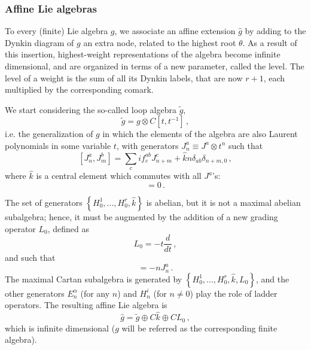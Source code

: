 \documentclass[a4paper,12pt]{report}
\begin{document}
\vspace{0.5cm}

\subsubsection{Affine Lie algebras}

To every (finite) Lie algebra $g$, we associate an affine extension $\hat{g}$ by adding to the Dynkin diagram of
$g$ an extra node, related to the highest root $\theta$. As a result of this insertion, highest-weight
representations of the algebra become infinite dimensional, and are organized in terms of a new parameter, called
the level. The level of a weight is the sum of all its Dynkin labels, that are now $r+1$, each multiplied by the
corresponding comark.

We start considering the so-called loop algebra $\tilde{g}$,
\begin{equation}
\tilde{g}=g\otimes C\left[t,t^{-1}\right]\,,
\end{equation}
i.e. the generalization of $g$ in which the elements of the algebra are also Laurent polynomials in some variable
$t$, with generators $J_{n}^{a}\equiv J^{a}\otimes t^{n}$ such that
\begin{equation}\label{currentalg}
[J_{n}^{a},J_{m}^{b}]=\sum_{c}if^{ab}_{c}J_{n+m}^{c}+\hat{k}n\delta_{ab}\delta_{n+m,0}\,,
\end{equation}
where $\hat{k}$ is a central element which commutes with all $J^{a}$'s:
\begin{equation}
[J_{n}^{a},\hat{k}]=0\,.
\end{equation}

The set of generators $\left\{H_{0}^{1},...,H_{0}^{r},\hat{k}\right\}$ is abelian, but it is not a maximal
abelian subalgebra; hence, it must be augmented by the addition of a new grading operator $L_{0}$, defined as
\begin{equation}
L_{0}=-t\frac{d}{dt}\,,
\end{equation}
and such that
\begin{equation}
[L_{0},J_{n}^{a}]=-nJ_{n}^{a}\,.
\end{equation}
The maximal Cartan subalgebra is generated by $\left\{H_{0}^{1},...,H_{0}^{r},\hat{k},L_{0}\right\}$, and the
other generators $E_{n}^{\alpha}$ (for any $n$) and $H_{n}^{i}$ (for $n\neq 0$) play the role of ladder operators.
The resulting affine Lie algebra is
\begin{equation}
\hat{g}=\tilde{g}\oplus C\hat{k}\oplus C L_{0}\,,
\end{equation}
which is infinite dimensional ($g$ will be referred as the corresponding finite algebra).
\end{document}
